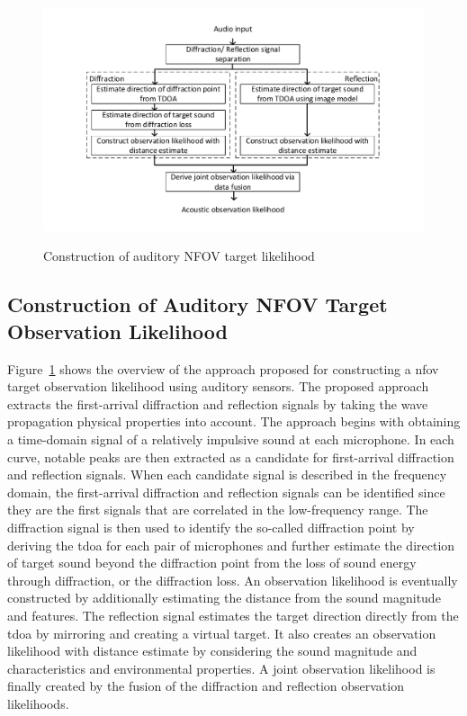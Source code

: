 \documentclass[letterpaper, 10 pt, conference]{ieeeconf}  %
\begin{document}
\begin{figure}[h]
    {\centering
        \includegraphics[trim =20mm 15mm 20mm 5mm,width=\columnwidth]{Figures/approach.pdf}
%         
    }
    \caption{\footnotesize {Construction of auditory NFOV target likelihood} }
    \label{fig:auditory_procedure}
\end{figure}
\subsection{Construction of Auditory NFOV Target Observation Likelihood}
Figure~\ref{fig:auditory_procedure} shows the overview of the approach proposed for constructing a \gls{nfov} target observation likelihood using auditory sensors. The proposed approach extracts the first-arrival diffraction and reflection signals by taking the wave propagation physical properties into account. The approach begins with obtaining a time-domain signal of a relatively impulsive sound at each microphone. In each curve, notable peaks are then extracted as a candidate for first-arrival diffraction and reflection signals. When each candidate signal is described in the frequency domain, the first-arrival diffraction and reflection signals can be identified since they are the first signals that are correlated in the low-frequency range. The diffraction signal is then used to identify the so-called diffraction point by deriving the \gls{tdoa} for each pair of microphones and further estimate the direction of target sound beyond the diffraction point from the loss of sound energy through diffraction, or the diffraction loss. An observation likelihood is eventually constructed by additionally estimating the distance from the sound magnitude and features. The reflection signal estimates the target direction directly from the \gls{tdoa} by mirroring and creating a virtual target.  It also creates an observation likelihood with distance estimate by considering the sound magnitude and characteristics and environmental properties. A joint observation likelihood is finally created by the fusion of the diffraction and reflection observation likelihoods.  
\end{document}
